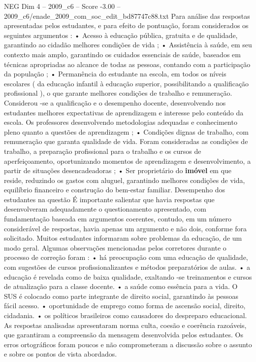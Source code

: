 \begin{textsample}{NEG Dim 4 – 2009\_c6 – Score -3.00 – 2009\_c6/enade\_2009\_com\_soc\_edit\_bd87747c88.txt}
Para análise das respostas apresentadas pelos estudantes, e para efeito de pontuação, foram considerados os seguintes argumentos : • Acesso à educação pública, gratuita e de qualidade, garantindo ao cidadão melhores condições de vida ; • Assistência à saúde, em seu contexto mais amplo, garantindo os cuidados essenciais de saúde, baseados em técnicas apropriadas ao alcance de todas as pessoas, contando com a participação da população ; • Permanência do estudante na escola, em todos os níveis escolares ( da educação infantil à educação superior, possibilitando a qualificação profissional ), o que garante melhores condições de trabalho e remuneração.
Considerou -se a qualificação e o desempenho docente, desenvolvendo nos estudantes melhores expectativas de aprendizagem e interesse pelo conteúdo da escola.
Os professores desenvolvendo metodologias adequadas e conhecimento pleno quanto a questões de aprendizagem ; • Condições dignas de trabalho, com remuneração que garanta qualidade de vida.
Foram consideradas as condições de trabalho, a preparação profissional para o trabalho e os cursos de aperfeiçoamento, oportunizando momentos de aprendizagem e desenvolvimento, a partir de situações desencadeadoras ; • Ser proprietário do \textbf{imóvel} em que reside, reduzindo os gastos com aluguel, garantindo melhores condições de vida, equilíbrio financeiro e construção do bem-estar familiar.
Desempenho dos estudantes na questão É importante salientar que havia respostas que desenvolveram adequadamente o questionamento apresentado, com fundamentação baseada em argumentos coerentes, contudo, em um número considerável de respostas, havia apenas um argumento e não dois, conforme fora solicitado.
Muitos estudantes informaram sobre problemas da educação, de um modo geral.
Algumas observações mencionadas pelos corretores durante o processo de correção foram : • há preocupação com uma educação de qualidade, com sugestões de cursos profissionalizantes e métodos preparatórios de aulas. • a educação é revelada como de baixa qualidade, exaltando -se treinamentos e cursos de atualização para a classe docente. • a saúde como essência para a vida.
O SUS é colocado como parte integrante de direito social, garantindo às pessoas fácil acesso. • oportunidade de emprego como forma de ascensão social, direito, cidadania. • os políticos brasileiros como causadores do despreparo educacional.
As respostas analisadas apresentaram norma culta, coesão e coerência razoáveis, que garantiram a compreensão da mensagem desenvolvida pelos estudantes.
Os erros ortográficos foram poucos e não comprometeram a discussão sobre o assunto e sobre os pontos de vista abordados.

\end{textsample}
